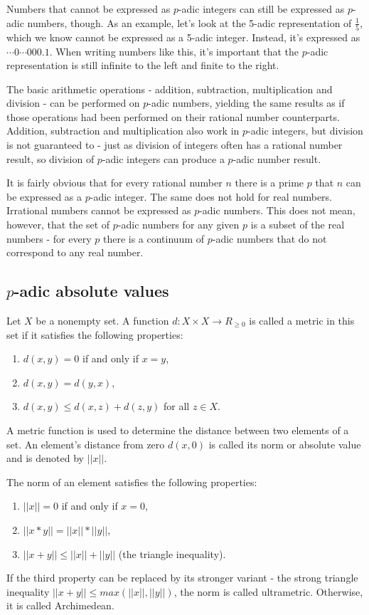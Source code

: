 \documentclass{llncs}
\begin{document}
Numbers that cannot be expressed as $p$-adic integers can still be expressed as $p$-adic numbers, though. As an example, let's look at the 5-adic representation of $\frac{1}{5}$, which we know cannot be expressed as a 5-adic integer. Instead, it's expressed as $\cdots 0 \cdots 000.1$. When writing numbers like this, it's important that the $p$-adic representation is still infinite to the left and finite to the right.

The basic arithmetic operations - addition, subtraction, multiplication and division - can be performed on $p$-adic numbers, yielding the same results as if those operations had been performed on their rational number counterparts. Addition, subtraction and multiplication also work in $p$-adic integers, but division is not guaranteed to - just as division of integers often has a rational number result, so division of $p$-adic integers can produce a $p$-adic number result.

It is fairly obvious that for every rational number $n$ there is a prime $p$ that $n$ can be expressed as a $p$-adic integer. The same does not hold for real numbers. Irrational numbers cannot be expressed as $p$-adic numbers. This does not mean, however, that the set of $p$-adic numbers for any given $p$ is a subset of the real numbers - for every $p$ there is a continuum of $p$-adic numbers that do not correspond to any real number. \cite{Rus12}
\subsection{$p$-adic absolute values}
Let $X$ be a nonempty set. A function $d: X \times X \rightarrow R_{\geq 0}$ is called a metric in this set if it satisfies the following properties:
\begin{enumerate}
\item $d(x,y) = 0$ if and only if $x = y$,\\
\item $d(x,y) = d(y,x)$,\\
\item $d(x,y) \leq d(x,z) + d(z,y)$ for all $z \in X$.
\end{enumerate}
A metric function is used to determine the distance between two elements of a set. An element's distance from zero $d(x,0)$ is called its norm or absolute value and is denoted by $||x||$.

The norm of an element satisfies the following properties:
\begin{enumerate}
\item $||x||=0$ if and only if $x=0$,\\
\item $||x*y|| = ||x||*||y||$,\\
\item $||x+y|| \leq ||x||+||y||$ (the triangle inequality).
\end{enumerate}
If the third property can be replaced by its stronger variant - the strong triangle inequality $||x+y|| \leq max(||x||,||y||)$, the norm is called ultrametric. Otherwise, it is called Archimedean. \cite{Rus12}
\end{document}
